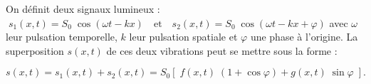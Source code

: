 
\hauteurLargeurCadreReponse		{6mm}{2.75cm}
\initialisationEntrainement

On définit deux signaux lumineux : $\; s_1 \left( x,t \right)=S_0 \; \cos \left( \omega t - k x\right) \quad \text{et} \quad s_2 \left(x,t\right)=S_0 \; \cos \left( \omega t - k x + \varphi\right)$
avec $\omega$ leur pulsation temporelle, $k$ leur pulsation spatiale et $\varphi$ une phase à l'origine. La superposition $s \left(x,t\right)$ de ces deux vibrations peut se mettre sous la forme :

\begin{equation*}
	s \left(x,t\right) = s_1 \left(x,t\right) + s_2 \left(x,t\right) = S_0 \left[ \; f\left(x,t\right)\; \left( 1+\cos \varphi \right) + g\left(x,t\right) \; \sin \varphi \; \right].
\end{equation*}

\debutEntrainement

